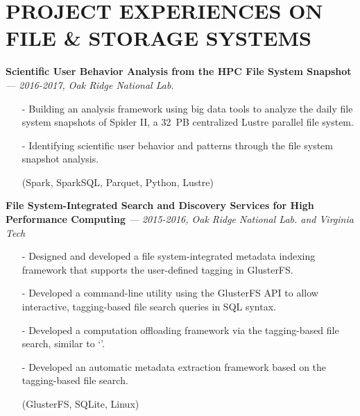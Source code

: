 \section{PROJECT EXPERIENCES ON FILE \& STORAGE SYSTEMS} 
\vspace{0.03in}
  {\bf Scientific User Behavior Analysis from the HPC File System Snapshot}
   {\it \footnotesize --- 2016-2017, Oak Ridge National Lab.}
   \begin{itemize}[leftmargin=*]
    \setlength\itemsep{-0.02in}
    \item[-] Building an analysis framework using big data tools to analyze
		the daily file system snapshots of Spider II,
		a 32~PB centralized Lustre parallel file system.
    \item[-] Identifying scientific user behavior and patterns
		through the file system snapshot analysis.
    \item[] {\small(Spark, SparkSQL, Parquet, Python, Lustre)}
   \end{itemize}
  \vspace{-0.15in}
  {\bf File System-Integrated Search and Discovery Services for High Performance Computing}
   {\it \footnotesize --- 2015-2016, Oak Ridge National Lab. and Virginia Tech}
   \begin{itemize}[leftmargin=*]
    \setlength\itemsep{-0.02in}
    \item[-] Designed and developed a file system-integrated metadata indexing framework
	     that supports the user-defined tagging in GlusterFS.
    \item[-] Developed a command-line utility using the GlusterFS API to
             allow interactive, tagging-based file search queries in SQL syntax.
    \item[-] Developed a computation offloading framework via the tagging-based file search,
             similar to `'.
    \item[-] Developed an automatic metadata
	     extraction framework based on the tagging-based file search.
    \item[] {\small(GlusterFS, SQLite, Linux)}
   \end{itemize}
  \vspace{-0.15in}
